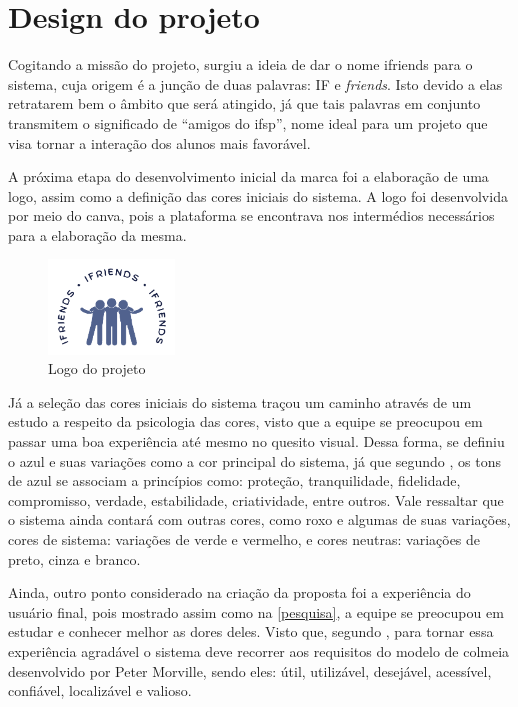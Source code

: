 \section{Design do projeto}
Cogitando a missão do projeto, surgiu a ideia de dar o nome \gls{ifriends} para o sistema, cuja origem é a junção de duas palavras: IF e \textsl{friends}. Isto devido a elas retratarem bem o âmbito que será atingido, já que tais palavras em conjunto transmitem o significado de ``amigos do \acs{ifsp}'', nome ideal para um projeto que visa tornar a interação dos alunos mais favorável.

A próxima etapa do desenvolvimento inicial da marca foi a elaboração de uma logo, assim como a definição das cores iniciais do sistema. A logo foi desenvolvida por meio do \gls{canva}, pois a plataforma se encontrava nos intermédios necessários para a elaboração da mesma. 

\begin{figure}[htb]
\centering
\caption{Logo do projeto}
\includegraphics[width=0.3\textwidth]{anexos/Imagens_Proposta/logo.png}
\end{figure}
\FloatBarrier

Já a seleção das cores iniciais do sistema traçou um caminho através de um estudo a respeito da psicologia das cores, visto que a equipe se preocupou em passar uma boa experiência até mesmo no quesito visual. Dessa forma, se definiu o azul e suas variações como a cor principal do sistema, já que segundo , os tons de azul se associam a princípios como: proteção, tranquilidade, fidelidade, compromisso, verdade, estabilidade, criatividade, entre outros. Vale ressaltar que o sistema ainda contará com outras cores, como roxo e algumas de suas variações, cores de sistema: variações de verde e vermelho, e cores neutras: variações de preto, cinza e branco.

Ainda, outro ponto considerado na criação da proposta foi a experiência do usuário final, pois mostrado assim como na \autoref{pesquisa}, a equipe se preocupou em estudar e conhecer melhor as dores deles. Visto que, segundo , para tornar essa experiência agradável o sistema deve recorrer aos requisitos do modelo de colmeia desenvolvido por Peter Morville, sendo eles: útil, utilizável, desejável, acessível, confiável, localizável e valioso.

